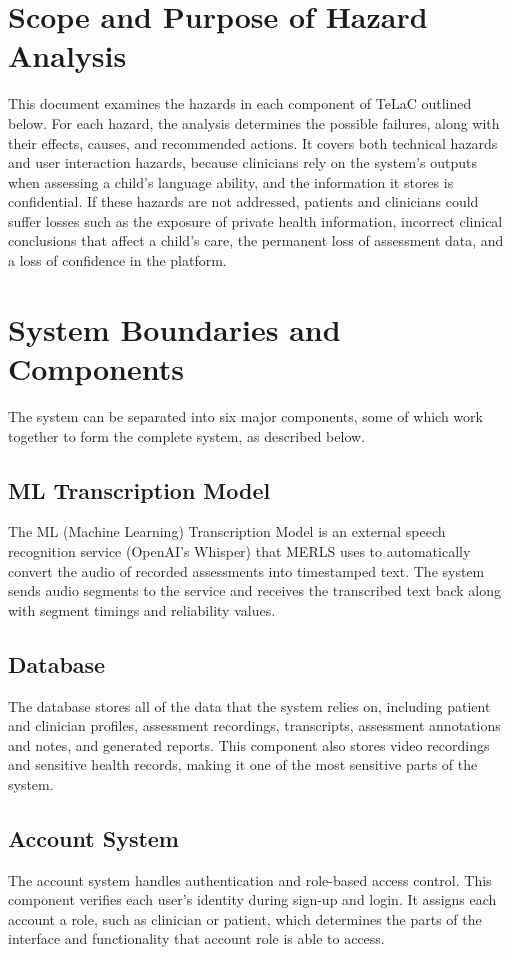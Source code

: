 \documentclass{article}
\begin{document}
\section{Scope and Purpose of Hazard Analysis} \label{sec:Scope}

This document examines the hazards in each component of TeLaC outlined below. 
For each hazard, the analysis determines the possible failures, along with their effects, causes, and recommended actions. 
It covers both technical hazards and user interaction hazards, because clinicians rely on the system’s outputs when assessing a child’s language ability, and the information it stores is confidential. 
If these hazards are not addressed, patients and clinicians could suffer losses such as the exposure of private health information, incorrect clinical conclusions that affect a child’s care, the permanent loss of assessment data, and a loss of confidence in the platform.

\section{System Boundaries and Components} \label{sec:Boundaries}



The system can be separated into six major components, some of which work together
to form the complete system, as described below.

\subsection{ML Transcription Model}
The ML (Machine Learning) Transcription Model is an external speech recognition service (OpenAI's Whisper) that MERLS uses to automatically convert the audio of recorded assessments into timestamped text. The system sends audio segments to the service and receives the transcribed text back along with segment timings and reliability values.

\subsection{Database}
The database stores all of the data that the system relies on, including patient and clinician
profiles, assessment recordings, transcripts, assessment annotations and notes, and
generated reports. This component also stores video recordings and sensitive health records,
making it one of the most sensitive parts of the system.

\subsection{Account System}
The account system handles authentication and role-based access control. This component verifies each user’s identity during sign-up and login. It assigns each account a role, such as clinician or patient, which determines the  parts of the interface and functionality that account role is able to access.
\end{document}
